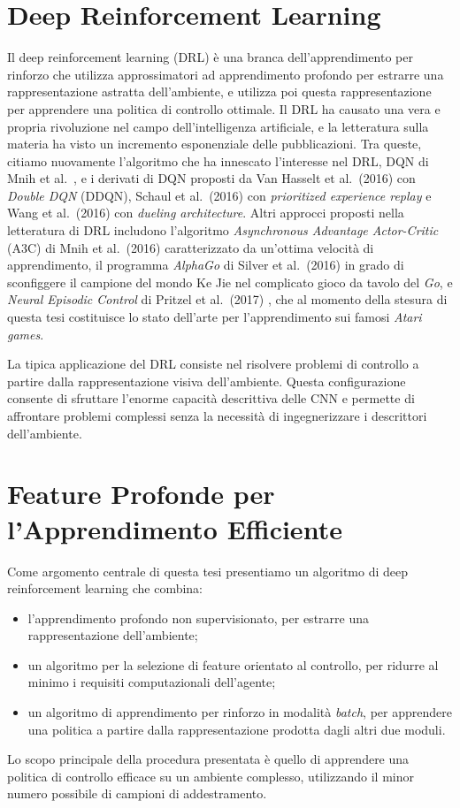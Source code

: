 \section*{Deep Reinforcement Learning}
Il deep reinforcement learning (DRL) \`e una branca dell'apprendimento 
per rinforzo che utilizza approssimatori ad apprendimento profondo per
estrarre una rappresentazione astratta dell'ambiente, e utilizza poi questa
rappresentazione per apprendere una politica di controllo ottimale.
Il DRL ha causato una vera e propria rivoluzione nel campo dell'intelligenza 
artificiale, e la letteratura sulla materia ha visto un incremento esponenziale
delle pubblicazioni.
Tra queste, citiamo nuovamente l'algoritmo che ha innescato l'interesse nel DRL, 
DQN di Mnih et al.\ \cite{mnih2015human}, e i derivati di DQN proposti da Van 
Hasselt et al.\ (2016) \cite{van2016deep} con \textit{Double DQN} (DDQN), Schaul 
et al.\ (2016) \cite{schaul2016prioritized} con \textit{prioritized experience 
replay} e Wang et al.\ (2016) \cite{wang2016dueling} con 
\textit{dueling architecture}. 
Altri approcci proposti nella letteratura di DRL includono l'algoritmo 
\textit{Asynchronous Advantage Actor-Critic} (A3C) di Mnih et al.\ (2016) 
\cite{mnih2016asynchronous} caratterizzato da un'ottima velocit\`a di 
apprendimento, il programma \textit{AlphaGo} di Silver et al.\ (2016) 
\cite{silver2016mastering} in grado di sconfiggere il campione del mondo Ke Jie
nel complicato gioco da tavolo del \textit{Go}, e \textit{Neural Episodic 
Control} di Pritzel et al.\ (2017) \cite{pritzel2017neural}, che al momento
della stesura di questa tesi costituisce lo stato dell'arte per l'apprendimento 
sui famosi \textit{Atari games}.

La tipica applicazione del DRL consiste nel risolvere problemi di controllo a 
partire dalla rappresentazione visiva dell'ambiente. Questa configurazione 
consente di sfruttare l'enorme capacit\`a descrittiva delle CNN e permette di 
affrontare problemi complessi senza la necessit\`a di ingegnerizzare i
descrittori dell'ambiente. 

\section*{Feature Profonde per l'Apprendimento Efficiente}
Come argomento centrale di questa tesi presentiamo un algoritmo di deep 
reinforcement learning che combina:
\begin{itemize}
    \item l'apprendimento profondo non supervisionato, per estrarre una 
    rappresentazione dell'ambiente;
    \item un algoritmo per la selezione di feature orientato al controllo, per
    ridurre al minimo i requisiti computazionali dell'agente;
    \item un algoritmo di apprendimento per rinforzo in modalit\`a \textit{batch}, 
    per apprendere una politica a partire dalla rappresentazione prodotta dagli 
    altri due moduli.
\end{itemize}
Lo scopo principale della procedura presentata \`e quello di apprendere una
politica di controllo efficace su un ambiente complesso, utilizzando il minor
numero possibile di campioni di addestramento. 

